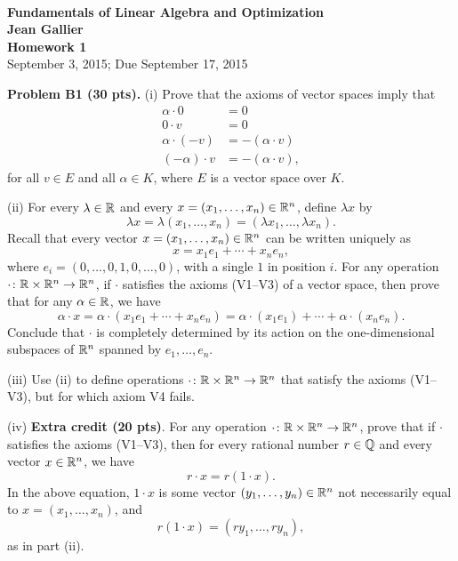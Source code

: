 \documentclass[12pt]{article}
\begin{document}
\begin{center}
\\
\vspace{1cm}
{\Large\bf Fundamentals of Linear Algebra and Optimization\\
Jean Gallier \\
\vspace{0.5cm}
Homework 1}\\[10pt]
September 3, 2015; Due September 17, 2015\\
\end{center}


\vspace {0.25cm}\noindent
{\bf Problem B1 (30 pts).}
(i)
Prove that the axioms of vector spaces imply that
\begin{align*}
\alpha\cdot 0 & = 0\\
0 \cdot v & = 0 \\
\alpha\cdot (-v) & = -(\alpha\cdot v) \\
(-\alpha)\cdot v & =  - (\alpha \cdot v),
\end{align*}
for all $v\in E$ and all $\alpha\in K$, where $E$ is a vector  space over
$K$.

\medskip
(ii)
For every $\lambda\in \mathbb{R}$ and every
$x = (x_1, \ldots, x_n) \in \mathbb{R}^n$, define
$\lambda x$ by
\[
\lambda x = \lambda (x_1, \ldots, x_n)
= (\lambda x_1, \ldots, \lambda x_n).
\]
Recall that every vector 
$x = (x_1, \ldots, x_n) \in \mathbb{R}^n$ can be written uniquely as
\[
x = x_1 e_1 + \cdots + x_n e_n,
\]
where $e_i = (0, \ldots, 0, 1, 0, \ldots, 0)$, with a single $1$ in
position $i$. For any operation 
$\cdot\colon \mathbb{R}\times  \mathbb{R}^n\rightarrow \mathbb{R}^n$,
if $\cdot $ satisfies the axioms (V1--V3) of a vector space, then
prove that for any $\alpha\in \mathbb{R}$, we have
\[
\alpha\cdot x = 
\alpha \cdot (x_1 e_1 + \cdots + x_n e_n)
= \alpha \cdot (x_1e_1) + \cdots +
\alpha \cdot  (x_ne_n). 
\]
Conclude that $\cdot$ is completely determined by
its action on the one-dimensional subspaces of $\mathbb{R}^n$  spanned by
$e_1, \ldots, e_n$.

\medskip
(iii)
Use (ii) to define operations $\cdot\colon \mathbb{R}\times
  \mathbb{R}^n\rightarrow \mathbb{R}^n$
that satisfy the axioms (V1--V3), but for which axiom V4 fails.

\medskip
(iv) {\bf Extra credit (20 pts)\/}.
For any operation 
$\cdot\colon \mathbb{R}\times  \mathbb{R}^n\rightarrow \mathbb{R}^n$, prove that
if $\cdot $ satisfies the axioms (V1--V3), then  
for every rational number $r\in \mathbb{Q}$ and every vector
$x\in \mathbb{R}^n$, 
we have
\[
r\cdot x = r(1\cdot x).
\]
In the above equation, $1\cdot x$ is some vector
$(y_1, \ldots, y_n)\in \mathbb{R}^n$ not necessarily equal to
$x = (x_1, \ldots, x_n)$,  and 
\[
r(1\cdot x) = (ry_1, \ldots, ry_n),
\]
as in part (ii).
\end{document}

